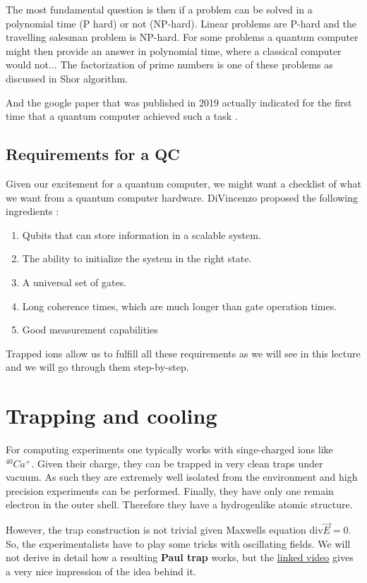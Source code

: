\documentclass[10pt]{article}
\let\cite\citep
\providecommand\citep{\cite}
\begin{document}
The most fundamental question is then if a problem can be solved in a polynomial time (P hard) or not (NP-hard). Linear problems are P-hard and the travelling salesman problem is NP-hard. For some problems a quantum computer might then provide an answer in polynomial time, where a classical computer would not... The factorization of prime numbers is one of these problems as discussed in Shor algorithm. 

And the google paper that was published in 2019 actually indicated for the first time that a quantum computer achieved such a task \cite{Arute_2019}. 



\subsection{Requirements for a QC}
Given our excitement for a quantum computer, we might want a checklist of what we want from a quantum computer hardware.  DiVincenzo proposed the following ingredients \cite{HAFFNER_2008}:
\begin{enumerate}
\item Qubits that can store information in a scalable system.
\item The ability to initialize the system in the right state.
\item A universal set of gates.
\item Long coherence times, which are much longer than gate operation times.
\item Good measurement capabilities
\end{enumerate}

Trapped ions allow us to fulfill all these requirements as we will see in this lecture and we will go through them step-by-step. 

\section{Trapping and cooling}
For computing experiments one typically works with singe-charged ions like $^{40}Ca^+$. Given their charge, they can be trapped in very clean traps under vacuum. As such they are extremely well isolated from the environment and high precision experiments can be performed. Finally, they have only one remain electron in the outer shell. Therefore they have a hydrogenlike atomic structure.

However, the trap construction is not trivial given Maxwells equation $\text{div} \vec{E} = 0$. So, the experimentalists have to play some tricks with oscillating fields. We will not derive in detail how a resulting \textbf{Paul trap} works, but the  \href{https://youtu.be/Xb-zpM0UOzk}{linked video} gives a very nice impression of the idea behind it. 
\end{document}
